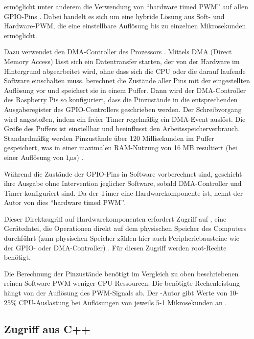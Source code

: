 \documentclass[german]{thesis_KBS}
\begin{document}
\pigpio{} ermöglicht unter anderem die Verwendung von "`hardware timed PWM"' auf
allen GPIO-Pins \cite{pigpio-web}. Dabei handelt es sich um eine hybride Lösung
aus Soft- und Hardware-PWM, die eine einstellbare Auflösung bis zu einzelnen
Mikrosekunden ermöglicht.

Dazu verwendet \pigpio{} den DMA-Controller des Prozessors
\cite{bcm2835-peripherals}. Mittels DMA (Direct Memory Access) lässt sich ein
Datentransfer starten, der von der Hardware im Hintergrund abgearbeitet wird,
ohne dass sich die CPU oder die darauf laufende Software einschalten muss.
\pigpio{} berechnet die Zustände aller Pins mit der eingestellten Auflösung vor
und speichert sie in einem Puffer. Dann wird der DMA-Controller des Raspberry
Pis so konfiguriert, dass die Pinzustände in die entsprechenden Ausgaberegister
des GPIO-Controllers geschrieben werden. Der Schreibvorgang wird angestoßen,
indem ein freier Timer regelmäßig ein DMA-Event auslöst. Die Größe des Puffers
ist einstellbar und beeinflusst den Arbeitsspeicherverbrauch. Standardmäßig
werden Pinzustände über 120 Millisekunden im Puffer gespeichert, was in einer
maximalen RAM-Nutzung von 16 MB resultiert (bei einer Auflösung von $1 \mu s$)
\cite{pigpio-gpioCfgBufferSize}.

Während die Zustände der GPIO-Pins in Software vorberechnet sind, geschieht ihre
Ausgabe ohne Intervention jeglicher Software, sobald DMA-Controller und Timer
konfiguriert sind. Da der Timer eine Hardwarekomponente ist, nennt der Autor von
\pigpio{} dies "`hardware timed PWM"'.

Dieser Direktzugriff auf Hardwarekomponenten erfordert Zugriff auf
, eine Gerätedatei, die Operationen direkt auf dem physischen
Speicher des Computers durchführt (zum physischen Speicher zählen hier auch
Peripheriebausteine wie der GPIO- oder DMA-Controller) \cite{dev-mem}. Für
diesen Zugriff werden root-Rechte benötigt.

Die Berechnung der Pinzustände benötigt im Vergleich zu oben beschriebenen
reinen Software-PWM weniger CPU-Ressourcen. Die benötigte Rechenleistung hängt
von der Auflösung des PWM-Signals ab. Der \pigpio{}-Autor gibt Werte von 10-25\%
CPU-Auslastung bei Auflösungen von jeweils 5-1 Mikrosekunden an
\cite{pigpio-gpioCfgClock}.



\subsection{Zugriff aus C++}
\label{subsection:motor-c++}
\end{document}
